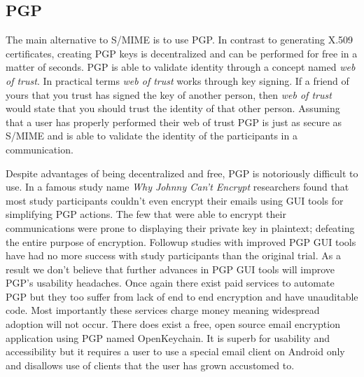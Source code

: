 \documentclass[10pt]{article}
\begin{document}
\begin{multicols}{2}
\subsection{PGP}
\par The main alternative to S/MIME is to use PGP. In contrast to generating X.509 certificates, creating PGP keys is decentralized and can be performed for free in a matter of seconds. PGP is able to validate identity through a concept named \textit{web of trust}. In practical terms \textit{web of trust} works through key signing. If a friend of yours that you trust has signed the key of another person, then \textit{web of trust} would state that you should trust the identity of that other person\cite{zimmermann1995official}. Assuming that a user has properly performed their web of trust PGP is just as secure as S/MIME and is able to validate the identity of the participants in a communication\cite{furnell2013usable}.
\par Despite advantages of being decentralized and free, PGP is notoriously difficult to use. In a famous study name \textit{Why Johnny Can't Encrypt} researchers found that most study participants couldn't even encrypt their emails using GUI tools for simplifying PGP actions. The few that were able to encrypt their communications were prone to displaying their private key in plaintext; defeating the entire purpose of encryption\cite{whitten1999johnny}. Followup studies with improved PGP GUI tools have had no more success with study participants than the original trial\cite{sheng2006johnny}. As a result we don't believe that further advances in PGP GUI tools will improve PGP's usability headaches. Once again there exist paid services to automate PGP but they too suffer from lack of end to end encryption and have unauditable code\cite{ciphermail-gateway,hushmail,eff-scorecard}. Most importantly these services charge money meaning widespread adoption will not occur. There does exist a free, open source email encryption application using PGP named OpenKeychain. It is superb for usability and accessibility but it requires a user to use a special email client on Android only and disallows use of clients that the user has grown accustomed to\cite{openkeychain}.

\end{multicols}
\end{document}
